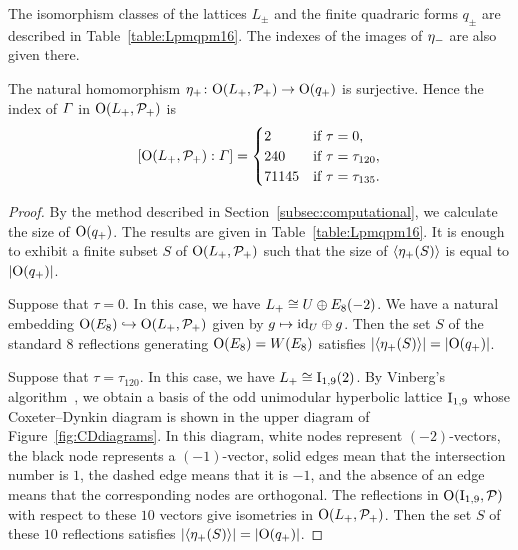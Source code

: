 \documentclass{amsart} %
\begin{document}
%
The isomorphism classes of the lattices $L_{\pm}$ and 
the finite quadraric forms $q_{\pm}$ are described in Table~\ref{table:Lpmqpm16}.
The indexes of the images of ${\eta}_{-}$  are  also given there.
%
\begin{proposition}\label{prop:etaplussurj16}
The natural homomorphism ${\eta}_{+}\colon \mathord{\mathrm{O}}(L_{+}, \mathord{\mathcal{P}}_{+})\to \mathord{\mathrm{O}}(q_{+})$  is surjective.
Hence the  index of $\varGamma$ in $\mathord{\mathrm{O}}(L_{+}, \mathord{\mathcal{P}}_{+})$  is
\[
[\mathord{\mathrm{O}}(L_{+}, \mathord{\mathcal{P}}_{+}): \varGamma]=
\begin{cases}
2 &  \textrm{if $\tau=0$}, \\
240 &  \textrm{if $\tau=\tau_{120}$}, \\
71145 &  \textrm{if $\tau=\tau_{135}$}.
\end{cases}
\]
\end{proposition}
%
\begin{proof}
By the method described in Section~\ref{subsec:computational},
we calculate the size of $\mathord{\mathrm{O}}(q_{+})$.
The results are given in Table~\ref{table:Lpmqpm16}.
It is enough to exhibit a finite subset $S$ 
of $\mathord{\mathrm{O}}(L_{+}, \mathord{\mathcal{P}}_{+})$ such that 
the size of $\langle {{\eta}_{+}(S)} \rangle$ is equal to $|\mathord{\mathrm{O}}(q_{+})|$.
\par
Suppose that $\tau=0$.
In this case,
we have $L_{+}\cong U\oplus E_8(-2)$.
We have a natural embedding $\mathord{\mathrm{O}}(E_8)\hookrightarrow \mathord{\mathrm{O}}(L_{+}, \mathord{\mathcal{P}}_{+})$
given by $g\mapsto \mathord{\mathrm{id}}_U \oplus g$.
Then  %
the set $S$ of the standard $8$ reflections generating $\mathord{\mathrm{O}}(E_8)=W(E_8)$ 
satisfies $|\langle {{\eta}_{+}(S)} \rangle|=|\mathord{\mathrm{O}}(q_{+})|$.
%
\par
Suppose that $\tau=\tau_{120}$.
In this case,
we have $L_{+}\cong \mathrm{I}_{1, 9}(2)$.
By Vinberg’s algorithm~\cite{Vinberg1985}, 
we obtain a basis of the odd unimodular hyperbolic  lattice $\mathrm{I}_{1,9}$ 
whose Coxeter–Dynkin diagram is shown in the upper diagram of Figure~\ref{fig:CDdiagrams}. 
In this diagram, 
white nodes represent $(-2)$-vectors, 
the black node represents a $(-1)$-vector,
solid edges mean that the intersection number is $1$, 
the dashed edge means that it is $-1$, 
and the absence of an edge means that the corresponding nodes  are orthogonal.
The reflections  in $\mathord{\mathrm{O}}(\mathrm{I}_{1,9}, \mathord{\mathcal{P}})$
with respect to these $10$ vectors
give isometries in $\mathord{\mathrm{O}}(L_{+}, \mathord{\mathcal{P}}_{+})$.
Then the set  $S$ of these $10$ reflections
satisfies $|\langle {{\eta}_{+}(S)} \rangle|=|\mathord{\mathrm{O}}(q_{+})|$.

\end{proof}
\end{document}
